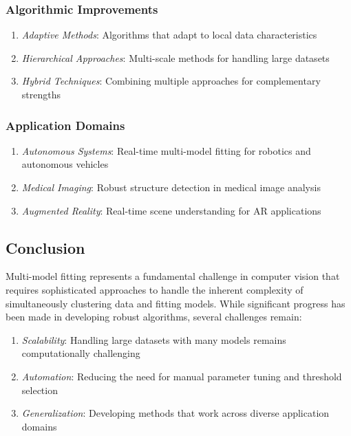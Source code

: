\documentclass[12pt]{article}
\begin{document}
\subsubsection{Algorithmic Improvements}
\label{subsubsec:algorithmic_improvements}

\begin{enumerate}
    \item \textit{Adaptive Methods}: Algorithms that adapt to local data characteristics
    \item \textit{Hierarchical Approaches}: Multi-scale methods for handling large datasets
    \item \textit{Hybrid Techniques}: Combining multiple approaches for complementary strengths
\end{enumerate}

\subsubsection{Application Domains}
\label{subsubsec:application_domains}

\begin{enumerate}
    \item \textit{Autonomous Systems}: Real-time multi-model fitting for robotics and autonomous vehicles
    \item \textit{Medical Imaging}: Robust structure detection in medical image analysis
    \item \textit{Augmented Reality}: Real-time scene understanding for AR applications
\end{enumerate}

\subsection{Conclusion}
\label{subsec:conclusion}

Multi-model fitting represents a fundamental challenge in computer vision that requires sophisticated approaches to handle the inherent complexity of simultaneously clustering data and fitting models. While significant progress has been made in developing robust algorithms, several challenges remain:

\begin{enumerate}
    \item \textit{Scalability}: Handling large datasets with many models remains computationally challenging
    \item \textit{Automation}: Reducing the need for manual parameter tuning and threshold selection
    \item \textit{Generalization}: Developing methods that work across diverse application domains
\end{enumerate}
\end{document}
